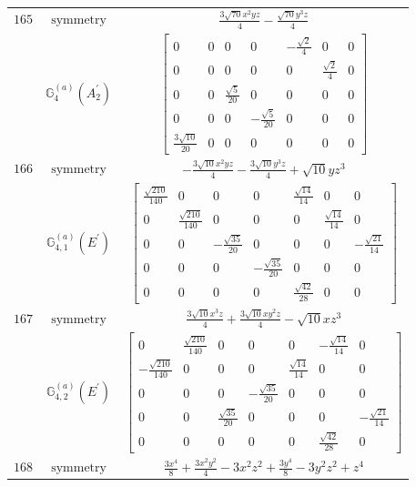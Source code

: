 \documentclass[fleqn,8pt,landscape]{jsarticle}
\begin{document}
\begin{longtable}{ccc}
$ 165 $ & $ \text{symmetry} $ & $ \frac{3 \sqrt{70} x^{2} y z}{4} - \frac{\sqrt{70} y^{3} z}{4} $ \\
$  $ & $ \mathbb{G}_{4}^{(a)}(A_{2}^{\prime}) $ & $ \begin{bmatrix} 0 & 0 & 0 & 0 & - \frac{\sqrt{2}}{4} & 0 & 0 \\ 0 & 0 & 0 & 0 & 0 & \frac{\sqrt{2}}{4} & 0 \\ 0 & 0 & \frac{\sqrt{5}}{20} & 0 & 0 & 0 & 0 \\ 0 & 0 & 0 & - \frac{\sqrt{5}}{20} & 0 & 0 & 0 \\ \frac{3 \sqrt{10}}{20} & 0 & 0 & 0 & 0 & 0 & 0 \end{bmatrix} $ \\ \hline
$ 166 $ & $ \text{symmetry} $ & $ - \frac{3 \sqrt{10} x^{2} y z}{4} - \frac{3 \sqrt{10} y^{3} z}{4} + \sqrt{10} y z^{3} $ \\
$  $ & $ \mathbb{G}_{4,1}^{(a)}(E^{\prime}) $ & $ \begin{bmatrix} \frac{\sqrt{210}}{140} & 0 & 0 & 0 & \frac{\sqrt{14}}{14} & 0 & 0 \\ 0 & \frac{\sqrt{210}}{140} & 0 & 0 & 0 & \frac{\sqrt{14}}{14} & 0 \\ 0 & 0 & - \frac{\sqrt{35}}{20} & 0 & 0 & 0 & - \frac{\sqrt{21}}{14} \\ 0 & 0 & 0 & - \frac{\sqrt{35}}{20} & 0 & 0 & 0 \\ 0 & 0 & 0 & 0 & \frac{\sqrt{42}}{28} & 0 & 0 \end{bmatrix} $ \\ \hline
$ 167 $ & $ \text{symmetry} $ & $ \frac{3 \sqrt{10} x^{3} z}{4} + \frac{3 \sqrt{10} x y^{2} z}{4} - \sqrt{10} x z^{3} $ \\
$  $ & $ \mathbb{G}_{4,2}^{(a)}(E^{\prime}) $ & $ \begin{bmatrix} 0 & \frac{\sqrt{210}}{140} & 0 & 0 & 0 & - \frac{\sqrt{14}}{14} & 0 \\ - \frac{\sqrt{210}}{140} & 0 & 0 & 0 & \frac{\sqrt{14}}{14} & 0 & 0 \\ 0 & 0 & 0 & - \frac{\sqrt{35}}{20} & 0 & 0 & 0 \\ 0 & 0 & \frac{\sqrt{35}}{20} & 0 & 0 & 0 & - \frac{\sqrt{21}}{14} \\ 0 & 0 & 0 & 0 & 0 & \frac{\sqrt{42}}{28} & 0 \end{bmatrix} $ \\ \hline
$ 168 $ & $ \text{symmetry} $ & $ \frac{3 x^{4}}{8} + \frac{3 x^{2} y^{2}}{4} - 3 x^{2} z^{2} + \frac{3 y^{4}}{8} - 3 y^{2} z^{2} + z^{4} $ \\

\end{longtable}
\end{document}
